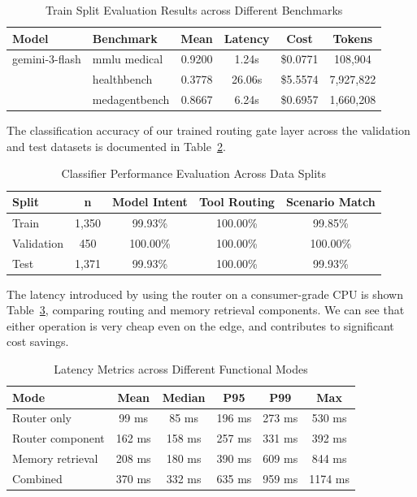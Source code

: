 \documentclass[conference]{IEEEtran}
\begin{document}
\begin{table}[htbp]
\centering
\caption{Train Split Evaluation Results across Different Benchmarks}
\label{tab:train_split_evaluation}
\begin{tabular}{p{1.4cm} p{1.6cm} c c c c}
\toprule
\textbf{Model} & \textbf{Benchmark} & \textbf{Mean} & \textbf{Latency} & \textbf{Cost} & \textbf{Tokens} \\
\midrule
gemini-3-flash & mmlu medical & 0.9200 & 1.24s & \$0.0771 & 108,904 \\
               & healthbench  & 0.3778 & 26.06s & \$5.5574 & 7,927,822 \\
               & medagentbench & 0.8667 & 6.24s & \$0.6957 & 1,660,208 \\
\bottomrule
\end{tabular}
\end{table}

The classification accuracy of our trained routing gate layer across the validation and test datasets is documented in Table~\ref{tab:split_evaluation}.

\begin{table}[htbp]
\centering
\caption{Classifier Performance Evaluation Across Data Splits}
\label{tab:split_evaluation}
\begin{tabular}{|l|c|c|c|c|}
\hline
\textbf{Split} & \textbf{n} & \textbf{Model Intent} & \textbf{Tool Routing} & \textbf{Scenario Match} \\
\hline
Train & 1,350 & 99.93\% & 100.00\% & 99.85\% \\
Validation & 450 & 100.00\% & 100.00\% & 100.00\% \\
Test & 1,371 & 99.93\% & 100.00\% & 99.93\% \\
\hline
\end{tabular}
\end{table}

The latency introduced by using the router on a consumer-grade CPU is shown Table~\ref{tab:latency_metrics}, comparing routing and memory retrieval components. We can see that either operation is very cheap even on the edge, and contributes to significant cost savings.

\begin{table}[htbp]
\centering
\caption{Latency Metrics across Different Functional Modes}
\label{tab:latency_metrics}
\begin{tabular}{p{2.3cm} c c c c c}
\toprule
\textbf{Mode} & \textbf{Mean} & \textbf{Median} & \textbf{P95} & \textbf{P99} & \textbf{Max} \\
\midrule
Router only & 99 ms & 85 ms & 196 ms & 273 ms & 530 ms \\
Router component & 162 ms & 158 ms & 257 ms & 331 ms & 392 ms \\
Memory retrieval & 208 ms & 180 ms & 390 ms & 609 ms & 844 ms \\
Combined & 370 ms & 332 ms & 635 ms & 959 ms & 1174 ms \\
\bottomrule
\end{tabular}
\end{table}
\end{document}

